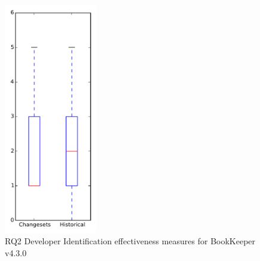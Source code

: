 
\begin{figure}[t]
\centering
\includegraphics[width=0.36\textwidth]{figures/dit/rq2_bookkeeper}
\caption{RQ2 Developer Identification effectiveness measures for BookKeeper v4.3.0}
\label{fig:dit:rq2:bookkeeper}
\end{figure}
